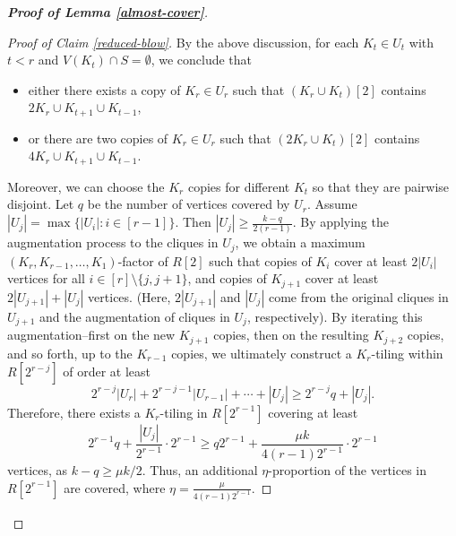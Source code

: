 \documentclass[11pt, a4paper]{article}
\theoremstyle{definition}
\newcommand{\<}{\subseteq}
\begin{document}
\begin{proof}[\bf Proof of Lemma \ref{almost-cover}]
\begin{proof}[Proof of Claim \ref{reduced-blow}]
By the above discussion, for each $K_t\in U_t$ with $t<r$ and $V(K_t)\cap S=\emptyset$, we conclude that 
\begin{itemize}
    \item either there exists a copy of $K_r\in U_r$ such that $(K_r\cup K_t)[2]$ contains $2K_r\cup K_{t+1}\cup K_{t-1}$,
    \item or there are two copies of $K_r\in U_r$ such that $(2K_r\cup K_t)[2]$ contains $4K_r\cup K_{t+1}\cup K_{t-1}$.
\end{itemize}
Moreover, we can choose the $K_r$ copies for different $K_t$ so that they are pairwise disjoint. Let $q$ be the number of vertices covered by $U_r$. Assume $|U_j|=\max\{|U_i|:i\in[r-1]\}$. Then $|U_j|\geq \frac{k-q}{2(r-1)}$. By applying the augmentation process to the cliques in $U_j$, we obtain a maximum $(K_r,K_{r-1},\ldots,K_1)$-factor of $R[2]$ such that copies of $K_i$ cover at least $2|U_i|$ vertices for all $i\in [r]\setminus \{j,j+1\}$, and copies of $K_{j+1}$ cover at least $2|U_{j+1}| + |U_j|$ vertices. (Here,  $2|U_{j+1}|$ and $|U_j|$  come from the original cliques in $U_{j+1}$  and the augmentation of cliques in $U_j$, respectively). %
By iterating this augmentation--first on the new $K_{j+1}$ copies, then on the resulting $K_{j+2}$ copies, and so forth, up to the $K_{r-1}$ copies, we ultimately construct a $K_r$-tiling within $R[2^{r-j}]$ of order at least 
$$
2^{r-j}|U_r|+2^{r-j-1}|U_{r-1}|+\cdots+|U_j|\geq 2^{r-j}q+|U_j|.
$$
Therefore, there exists a $K_r$-tiling in $R[2^{r-1}]$ covering at least 
$$
2^{r-1}q+\frac{|U_j|}{2^{r-1}}\cdot 2^{r-1}\geq q2^{r-1}+\frac{\mu k}{4(r-1)2^{r-1}}\cdot 2^{r-1}
$$
vertices, as $k-q\ge \mu k/2$. Thus, an additional  $\eta$-proportion of the vertices in $R[2^{r-1}]$ are covered, where $\eta=\frac{\mu}{4(r-1)2^{r-1}}$.


\end{proof}
\end{proof}
\end{document}
